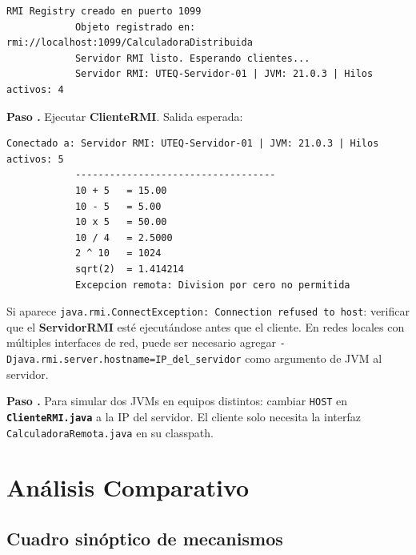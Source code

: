 \documentclass[12pt, a4paper, openany]{book}
\newcounter{paso}[section]
\newcommand{\paso}[1]{%
	\stepcounter{paso}%
	\medskip\noindent
	\begin{tcolorbox}[enhanced, colback=white, colframe=practiceBlue,
		boxrule=0.8pt, arc=3pt, left=6pt, right=6pt, top=4pt, bottom=4pt,
		before upper={\noindent}]
		\textcolor{practiceBlue}{\textbf{Paso \arabic{paso}.}} #1
	\end{tcolorbox}%
}
\newcommand{\code}[1]{\texttt{\small#1}}
\newcommand{\archivo}[1]{\texttt{\textbf{#1}}}
\begin{document}
	\begin{resultadobox}
		\begin{lstlisting}[style=BashStyle]
			RMI Registry creado en puerto 1099
			Objeto registrado en: rmi://localhost:1099/CalculadoraDistribuida
			Servidor RMI listo. Esperando clientes...
			Servidor RMI: UTEQ-Servidor-01 | JVM: 21.0.3 | Hilos activos: 4
		\end{lstlisting}
	\end{resultadobox}
	
	\paso{Ejecutar \textbf{ClienteRMI}. Salida esperada:}
	
	\begin{resultadobox}
		\begin{lstlisting}[style=BashStyle]
			Conectado a: Servidor RMI: UTEQ-Servidor-01 | JVM: 21.0.3 | Hilos activos: 5
			-----------------------------------
			10 + 5   = 15.00
			10 - 5   = 5.00
			10 x 5   = 50.00
			10 / 4   = 2.5000
			2 ^ 10   = 1024
			sqrt(2)  = 1.414214
			Excepcion remota: Division por cero no permitida
		\end{lstlisting}
	\end{resultadobox}
	
	\begin{advertenciabox}
		Si aparece \code{java.rmi.ConnectException: Connection refused to host}: verificar que
		el \textbf{ServidorRMI} esté ejecutándose antes que el cliente. En redes locales con
		múltiples interfaces de red, puede ser necesario agregar
		\code{-Djava.rmi.server.hostname=IP\_del\_servidor} como argumento de JVM al servidor.
	\end{advertenciabox}
	
	\paso{Para simular dos JVMs en equipos distintos: cambiar \code{HOST} en
		\archivo{ClienteRMI.java} a la IP del servidor. El cliente solo necesita la
		interfaz \code{CalculadoraRemota.java} en su classpath.}
	
	\chapter{Análisis Comparativo}
	
	\section{Cuadro sinóptico de mecanismos}
	
\end{document}
